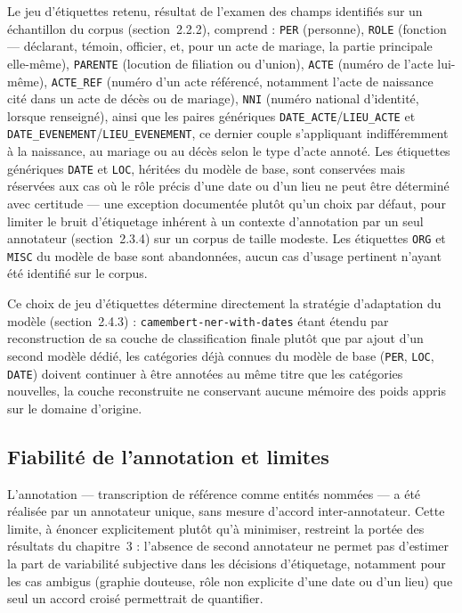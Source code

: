 Le jeu d'étiquettes retenu, résultat de l'examen des champs identifiés sur un échantillon du corpus (section~2.2.2), comprend : \texttt{PER} (personne), \texttt{ROLE} (fonction --- déclarant, témoin, officier, et, pour un acte de mariage, la partie principale elle-même), \texttt{PARENTE} (locution de filiation ou d'union), \texttt{ACTE} (numéro de l'acte lui-même), \texttt{ACTE\_REF} (numéro d'un acte référencé, notamment l'acte de naissance cité dans un acte de décès ou de mariage), \texttt{NNI} (numéro national d'identité, lorsque renseigné), ainsi que les paires génériques \texttt{DATE\_ACTE}/\texttt{LIEU\_ACTE} et \texttt{DATE\_EVENEMENT}/\texttt{LIEU\_EVENEMENT}, ce dernier couple s'appliquant indifféremment à la naissance, au mariage ou au décès selon le type d'acte annoté.
Les étiquettes génériques \texttt{DATE} et \texttt{LOC}, héritées du modèle de base, sont conservées mais réservées aux cas où le rôle précis d'une date ou d'un lieu ne peut être déterminé avec certitude --- une exception documentée plutôt qu'un choix par défaut, pour limiter le bruit d'étiquetage inhérent à un contexte d'annotation par un seul annotateur (section~2.3.4) sur un corpus de taille modeste.
Les étiquettes \texttt{ORG} et \texttt{MISC} du modèle de base sont abandonnées, aucun cas d'usage pertinent n'ayant été identifié sur le corpus.

Ce choix de jeu d'étiquettes détermine directement la stratégie d'adaptation du modèle (section~2.4.3) : \texttt{camembert-ner-with-dates} étant étendu par reconstruction de sa couche de classification finale plutôt que par ajout d'un second modèle dédié, les catégories déjà connues du modèle de base (\texttt{PER}, \texttt{LOC}, \texttt{DATE}) doivent continuer à être annotées au même titre que les catégories nouvelles, la couche reconstruite ne conservant aucune mémoire des poids appris sur le domaine d'origine.

\subsection{Fiabilité de l'annotation et limites}

L'annotation --- transcription de référence comme entités nommées --- a été réalisée par un annotateur unique, sans mesure d'accord inter-annotateur.
Cette limite, à énoncer explicitement plutôt qu'à minimiser, restreint la portée des résultats du chapitre~3 : l'absence de second annotateur ne permet pas d'estimer la part de variabilité subjective dans les décisions d'étiquetage, notamment pour les cas ambigus (graphie douteuse, rôle non explicite d'une date ou d'un lieu) que seul un accord croisé permettrait de quantifier.

